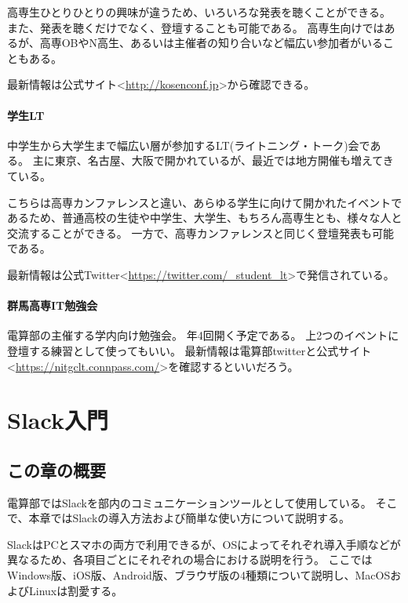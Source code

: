 \documentclass[lualatex,ja=standard,12pt,a4j]{bxjsbook}
\begin{document}
					高専生ひとりひとりの興味が違うため、いろいろな発表を聴くことができる。
					また、発表を聴くだけでなく、登壇することも可能である。
					高専生向けではあるが、高専OBやN高生、あるいは主催者の知り合いなど幅広い参加者がいることもある。
					
					最新情報は公式サイト<\url{http://kosenconf.jp}>から確認できる。
				\subsubsection{学生LT}
					中学生から大学生まで幅広い層が参加するLT(ライトニング・トーク)会である。
					主に東京、名古屋、大阪で開かれているが、最近では地方開催も増えてきている。
					
					こちらは高専カンファレンスと違い、あらゆる学生に向けて開かれたイベントであるため、普通高校の生徒や中学生、大学生、もちろん高専生とも、様々な人と交流することができる。
					一方で、高専カンファレンスと同じく登壇発表も可能である。
					
					最新情報は公式Twitter<\url{https://twitter.com/_student_lt}>で発信されている。
				\subsubsection{群馬高専IT勉強会}
					電算部の主催する学内向け勉強会。
					年4回開く予定である。
                    上2つのイベントに登壇する練習として使ってもいい。
					最新情報は電算部twitterと公式サイト<\url{https://nitgclt.connpass.com/}>を確認するといいだろう。
	\chapter{Slack入門}
		\section{この章の概要}
			電算部ではSlackを部内のコミュニケーションツールとして使用している。
            そこで、本章ではSlackの導入方法および簡単な使い方について説明する。
            
            SlackはPCとスマホの両方で利用できるが、OSによってそれぞれ導入手順などが異なるため、各項目ごとにそれぞれの場合における説明を行う。
            ここではWindows版、iOS版、Android版、ブラウザ版の4種類について説明し、MacOSおよびLinuxは割愛する。
            
\end{document}
